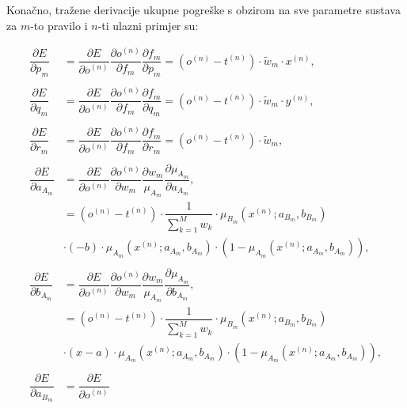 \documentclass[12pt, a4paper]{article}
\begin{document}
Konačno, tražene derivacije ukupne pogreške s obzirom na sve parametre sustava za $m$-to pravilo i $n$-ti ulazni primjer su:

\begin{align*}
  \dfrac{\partial E}{\partial p_m} &= 
    \dfrac{\partial E}{\partial o^{(n)}} 
    \dfrac{\partial o^{(n)}}{\partial f_m}
    \dfrac{\partial f_m}{\partial p_m} =
    \left( o^{(n)} - t^{(n)} \right) \cdot
    \widetilde{w}_m \cdot x^{(n)}, \\ \\
  \dfrac{\partial E}{\partial q_m} &= 
    \dfrac{\partial E}{\partial o^{(n)}} 
    \dfrac{\partial o^{(n)}}{\partial f_m}
    \dfrac{\partial f_m}{\partial q_m} =
    \left( o^{(n)} - t^{(n)} \right) \cdot
    \widetilde{w}_m \cdot y^{(n)}, \\ \\
  \dfrac{\partial E}{\partial r_m} &= 
    \dfrac{\partial E}{\partial o^{(n)}} 
    \dfrac{\partial o^{(n)}}{\partial f_m}
    \dfrac{\partial f_m}{\partial r_m} =
    \left( o^{(n)} - t^{(n)} \right) \cdot
    \widetilde{w}_m, \\ \\
  \dfrac{\partial E}{\partial a_{A_m}} &= 
    \dfrac{\partial E}{\partial o^{(n)}} 
    \dfrac{\partial o^{(n)}}{\partial w_m}
    \dfrac{\partial w_m}{\mu_{A_m}}
    \dfrac{\partial \mu_{A_m}}{\partial a_{A_m}}, \\ &=
    \left( o^{(n)} - t^{(n)} \right) \cdot
    \dfrac{1}{\sum_{k=1}^{M} w_k} \cdot
    \mu_{B_m} \left( x^{(n)}; a_{B_m}, b_{B_m} \right) \\ &\cdot
    (-b) \cdot \mu_{A_m} \left( x^{(n)}; a_{A_m}, b_{A_m} \right) \cdot \left( 1 - \mu_{A_m} \left( x^{(n)}; a_{A_m}, b_{A_m} \right) \right), \\ \\
  \dfrac{\partial E}{\partial b_{A_m}} &= 
    \dfrac{\partial E}{\partial o^{(n)}} 
    \dfrac{\partial o^{(n)}}{\partial w_m}
    \dfrac{\partial w_m}{\mu_{A_m}}
    \dfrac{\partial \mu_{A_m}}{\partial b_{A_m}}, \\ &=
    \left( o^{(n)} - t^{(n)} \right) \cdot
    \dfrac{1}{\sum_{k=1}^{M} w_k} \cdot
    \mu_{B_m} \left( x^{(n)}; a_{B_m}, b_{B_m} \right) \\ &\cdot
    (x - a) \cdot \mu_{A_m} \left( x^{(n)}; a_{A_m}, b_{A_m} \right) \cdot \left( 1 - \mu_{A_m} \left( x^{(n)}; a_{A_m}, b_{A_m} \right) \right), \\ \\
  \dfrac{\partial E}{\partial a_{B_m}} &= 
    \dfrac{\partial E}{\partial o^{(n)}} 

\end{align*}
\end{document}
